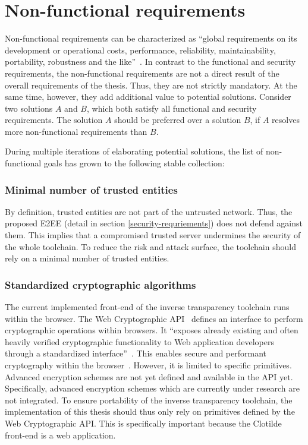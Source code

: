 \documentclass[../main.tex]{subfiles}
\begin{document}
\section{Non-functional requirements}\label{non-functional-requriements}
Non-functional requirements can be characterized as \enquote{global requirements on its development or operational costs, performance, reliability, maintainability, portability, robustness and the like}~\cite[11]{Mylopoulos1992}.
In contrast to the functional and security requirements, the non-functional requirements are not a direct result of the overall requirements of the thesis.
Thus, they are not strictly mandatory.
At the same time, however, they add additional value to potential solutions.
Consider two solutions $A$ and $B$, which both satisfy all functional and security requirements.
The solution $A$ should be preferred over a solution $B$, if $A$ resolves more non-functional requirements than $B$.

During multiple iterations of elaborating potential solutions, the list of non-functional goals has grown to the following stable collection:

\subsubsection{Minimal number of trusted entities}
By definition, trusted entities are not part of the untrusted network. 
Thus, the proposed E2EE (detail in section \ref{security-requriements}) does not defend against them.
This implies that a compromised trusted server undermines the security of the whole toolchain.
To reduce the risk and attack surface, the toolchain should rely on a minimal number of trusted entities.

\subsubsection{Standardized cryptographic algorithms}
The current implemented front-end of the inverse transparency toolchain runs within the browser. 
The Web Cryptographic API~\cite{WebCryptoApi2017} defines an interface to perform cryptographic operations within browsers. 
It \enquote{exposes already existing and often heavily verified cryptographic functionality to Web application developers through a standardized interface}~\cite[959]{Halpin2014}.
This enables secure and performant cryptography within the browser~\cite{Halpin2014}.
However, it is limited to specific primitives. 
Advanced encryption schemes are not yet defined and available in the API yet.
Specifically, advanced encryption schemes which are currently under research are not integrated.
To ensure portability of the inverse transparency toolchain, the implementation of this thesis should thus only rely on primitives defined by the Web Cryptographic API.
This is specifically important because the Clotilde front-end is a web application.
\end{document}
